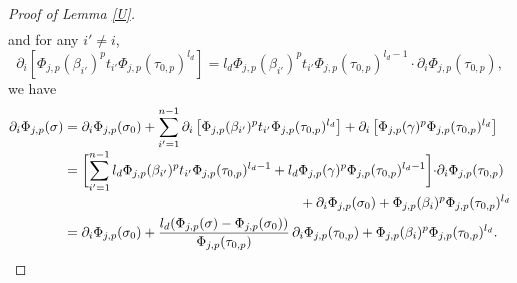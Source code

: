 \documentclass[JEP,XML,SOM,Unicode,published]{cedram}
\theoremstyle{plain}
\theoremstyle{definition}
\begin{document}
\begin{proof}[Proof of Lemma \ref{U}]
\begin{multline*}
\end{multline*}
and for any $i'\not=i$,\vspace*{-3pt}
\[
\partial_i[\Phi_{j,p}(\beta_{i'})^p t_{i'} \Phi_{j,p}(\tau_{0,p})^{l_d}]= l_d \Phi_{j,p}(\beta_{i'})^p t_{i'} \Phi_{j,p}(\tau_{0,p})^{l_d-1}\cdot \partial_i \Phi_{j,p}(\tau_{0,p}),
\]
we have\vspace*{-3pt}
\begin{align*}
\partial_i\Phi_{j,p}(\sigma) &= \partial_i \Phi_{j,p}(\sigma_0)+\sum_{i'=1}^{n-1} \partial_i\left[\Phi_{j,p}(\beta_{i'})^p t_{i'}\Phi_{j,p}(\tau_{0,p})^{l_d}\right]+\partial_i\left[\Phi_{j,p}(\gamma)^p\Phi_{j,p}(\tau_{0,p})^{l_d}\right]\\[-3pt]
&= \biggl[ \sum_{i'=1}^{n-1} l_d\Phi_{j,p}(\beta_{i'})^p t_{i'}\Phi_{j,p}(\tau_{0,p})^{l_d-1}+l_d \Phi_{j,p}(\gamma)^p\Phi_{j,p}(\tau_{0,p})^{l_d-1} \biggr]{\cdot} \partial_i \Phi_{j,p}(\tau_{0,p})\\[-2pt]
& \hspace*{6.1cm}+\partial_i\Phi_{j,p}(\sigma_0)+\Phi_{j,p}(\beta_i)^p\Phi_{j,p}(\tau_{0,p})^{l_d} \\
&= \partial_i\Phi_{j,p}(\sigma_0)+ \frac{l_d(\Phi_{j,p}(\sigma)-\Phi_{j,p}(\sigma_0))}{\Phi_{j,p}(\tau_{0,p})}\,\partial_i\Phi_{j,p}(\tau_{0,p})+ \Phi_{j,p}(\beta_i)^p \Phi_{j,p}(\tau_{0,p})^{l_d}.
\end{align*}


\end{proof}
\end{document}
